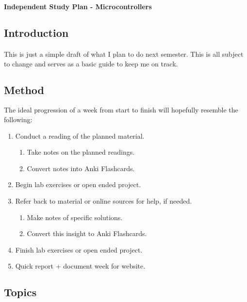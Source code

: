 \documentclass[12pt,a4paper,oneside,notitlepage]{article}
\begin{document}
\begin{center}
\large \textbf{Independent Study Plan - Microcontrollers}
\end{center}

\subsection*{Introduction}
\paragraph{}

This is just a simple draft of what I plan to do next semester. This is all subject to change and serves as a basic guide to keep me on track.

\subsection*{Method}

The ideal progression of a week from start to finish will hopefully resemble the following:
\begin{enumerate}
	\item Conduct a reading of the planned material.
	\begin{enumerate}
		\item Take notes on the planned readings.
		\item Convert notes into Anki Flashcards.
	\end{enumerate}
	\item Begin lab exercises or open ended project.
	\item Refer back to material or online sources for help, if needed.
	\begin{enumerate}
		\item Make notes of specific solutions.
		\item Convert this insight to Anki Flashcards.
	\end{enumerate}
	\item Finish lab exercises or open ended project.
	\item Quick report + document week for website.
\end{enumerate}

\subsection*{Topics}
\end{document}
